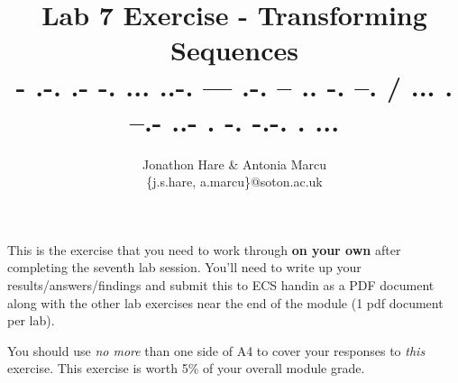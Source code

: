 \documentclass[a4paper]{article}
\begin{document}
\lstset{language=Python,upquote=true}

\setlength{\leftskip}{20pt}
\title{Lab 7 Exercise - Transforming Sequences\\- .-. .- -. ... ..-. --- .-. -- .. -. --. / ... . --.- ..- . -. -.-. . ...}
\author{Jonathon Hare \& Antonia Marcu\\\{j.s.hare, a.marcu\}@soton.ac.uk}

\maketitle


This is the exercise that you need to work through \textbf{on your own} after completing the seventh lab session. You'll need to write up your results/answers/findings and submit this to ECS handin as a PDF document along with the other lab exercises near the end of the module (1 pdf document per lab). 

You should use \emph{no more} than one side of A4 to cover your responses to \emph{this} exercise. This exercise is worth 5\% of your overall module grade.
\end{document}
